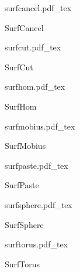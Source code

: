 \documentclass[12pt,a4paper]{article}
\newcommand{\incfig}[1]{%
    \def\svgwidth{\columnwidth}
    {#1.pdf_tex}
}
\begin{document}
\begin{figure}[ht]
    \centering
	\begin{minipage}[c][\totalheight][c]{\columnwidth}
    \incfig{surfcancel}
    \caption{SurfCancel}
	\end{minipage}
    \label{fig:surfcancel}
\end{figure}

\begin{figure}[ht]
    \centering
	\begin{minipage}[c][\totalheight][c]{\columnwidth}
    \incfig{surfcut}
    \caption{SurfCut}
	\end{minipage}
    \label{fig:surfcut}
\end{figure}

\begin{figure}[ht]
    \centering
	\begin{minipage}[c][\totalheight][c]{\columnwidth}
    \incfig{surfhom}
    \caption{SurfHom}
	\end{minipage}
    \label{fig:surfhom}
\end{figure}

\begin{figure}[ht]
    \centering
	\begin{minipage}[c][\totalheight][c]{\columnwidth}
    \incfig{surfmobius}
    \caption{SurfMobius}
	\end{minipage}
    \label{fig:surfmobius}
\end{figure}

\begin{figure}[ht]
    \centering
	\begin{minipage}[c][\totalheight][c]{\columnwidth}
    \incfig{surfpaste}
    \caption{SurfPaste}
	\end{minipage}
    \label{fig:surfpaste}
\end{figure}

\begin{figure}[ht]
    \centering
	\begin{minipage}[c][\totalheight][c]{\columnwidth}
    \incfig{surfsphere}
    \caption{SurfSphere}
	\end{minipage}
    \label{fig:surfsphere}
\end{figure}

\begin{figure}[ht]
    \centering
	\begin{minipage}[c][\totalheight][c]{\columnwidth}
    \incfig{surftorus}
    \caption{SurfTorus}
	\end{minipage}
    \label{fig:surftorus}
\end{figure}
\end{document}

